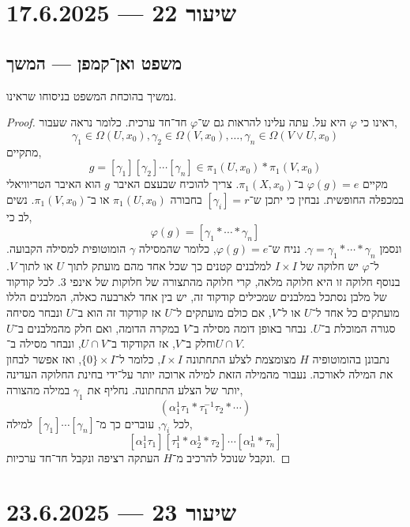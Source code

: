 \section{שיעור 22 --- 17.6.2025}

\subsection{משפט ואן־קמפן --- המשך}
נמשיך בהוכחת המשפט בניסוחו שראינו.
\begin{proof}
	ראינו כי $\varphi$ היא על.
	עתה עלינו להראות גם ש־$\varphi$ חד־חד ערכית.
	כלומר נראה שעבור,
	\[
		\gamma_1 \in \Omega(U, x_0),
		\gamma_2 \in \Omega(V, x_0),
		\ldots,
		\gamma_n \in \Omega(V \lor U, x_0)
	\]
	מתקיים,
	\[
		g = [\gamma_1] [\gamma_2] \cdots [\gamma_n] \in \pi_1(U, x_0) * \pi_1(V, x_0)
	\]
	מקיים $\varphi(g) = e$ ב־$\pi_1(X, x_0)$.
	צריך להוכיח שבעצם האיבר $g$ הוא האיבר הטריוויאלי במכפלה החופשית.
	נבחין כי יתכן ש־$[\gamma_i] = r$ בחבורה $\pi_1(U, x_0)$ או ב־$\pi_1(V, x_0)$.
	נשים לב כי,
	\[
		\varphi(g)
		= [\gamma_1 * \cdots * \gamma_n]
	\]
	ונסמן $\gamma = \gamma_1 * \cdots * \gamma_n$.
	נניח ש־$\varphi(g) = e$, כלומר שהמסילה $\gamma$ הומוטופית למסילה הקבועה.
	ל־$\varphi$ יש חלוקה של $I \times I$ למלבנים קטנים כך שכל אחד מהם מועתק לתוך $U$ או לתוך $V$.
	בנוסף חלוקה זו היא חלוקה מלאה, קרי חלוקה מהתצורה של חלוקות של אינפי 3.
	לכל קודקוד של מלבן נסתכל במלבנים שמכילים קודקוד זה, יש בין אחד לארבעה כאלה,
	המלבנים הללו מועתקים כל אחד ל־$U$ או ל־$V$, אם כולם מועתקים ל־$U$ אז קודקוד זה הוא ב־$U$ ונבחר מסיחה סגורה המוכלת ב־$U$.
	נבחר באופן דומה מסילה ב־$V$ במקרה הדומה, ואם חלק מהמלבנים ב־$U$ וחלק ב־$V$, אז הקודקוד ב־$U \cap V$, 
	ונבחר מסילה ב־$U \cap V$. \\
	נתבונן בהומוטופיה $H$ מצומצמת לצלע התחתונה $I \times I$, כלומר ל־$\{ 0 \} \times I$, ואז אפשר לבחון את המילה לאורכה.
	נעבור מהמילה הזאת למילה ארוכה יותר על־ידי בחינת החלוקה העדינה יותר של הצלע התחתונה.
	נחליף את $\gamma_1$ במילה מהצורה,
	\[
		(\alpha_1^1 \tau_1 * \tau_1^{-1} \tau_2 * \cdots)
	\]
	לכל $\gamma_i$, עוברים כך מ־$[\gamma_1] \cdots [\gamma_n]$ למילה,
	\[
		[\alpha_1^1 \tau_1] [\tau_1^1 * \alpha_2^1 * \tau_2] \cdots [\alpha_n^1 * \tau_n]
	\]
	ונקבל שנוכל להרכיב מ־$H$ העתקה רציפה ונקבל חד־חד ערכיות.
\end{proof}

\section{שיעור 23 --- 23.6.2025}

